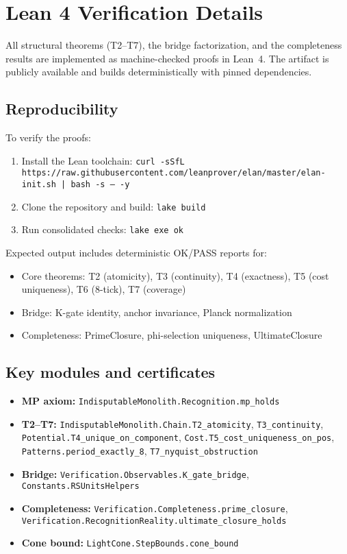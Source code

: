 \documentclass[11pt]{article}
\begin{document}
\appendix

\section{Lean 4 Verification Details}\label{app:lean-verification}

All structural theorems (T2--T7), the bridge factorization, and the completeness results are implemented as machine-checked proofs in Lean~4. The artifact is publicly available and builds deterministically with pinned dependencies.

\subsection*{Reproducibility}

To verify the proofs:
\begin{enumerate}
\item Install the Lean toolchain: \texttt{curl -sSfL https://raw.githubusercontent.com/leanprover/elan/master/elan-init.sh | bash -s -- -y}
\item Clone the repository and build: \texttt{lake build}
\item Run consolidated checks: \texttt{lake exe ok}
\end{enumerate}

Expected output includes deterministic OK/PASS reports for:
\begin{itemize}
\item Core theorems: T2 (atomicity), T3 (continuity), T4 (exactness), T5 (cost uniqueness), T6 (8-tick), T7 (coverage)
\item Bridge: K-gate identity, anchor invariance, Planck normalization
\item Completeness: PrimeClosure, phi-selection uniqueness, UltimateClosure
\end{itemize}

\subsection*{Key modules and certificates}

\begin{itemize}
\item \textbf{MP axiom:} \texttt{IndisputableMonolith.Recognition.mp\_holds}
\item \textbf{T2--T7:} \texttt{IndisputableMonolith.Chain.T2\_atomicity}, \texttt{T3\_continuity}, \texttt{Potential.T4\_unique\_on\_component}, \texttt{Cost.T5\_cost\_uniqueness\_on\_pos}, \texttt{Patterns.period\_exactly\_8}, \texttt{T7\_nyquist\_obstruction}
\item \textbf{Bridge:} \texttt{Verification.Observables.K\_gate\_bridge}, \texttt{Constants.RSUnitsHelpers}
\item \textbf{Completeness:} \texttt{Verification.Completeness.prime\_closure}, \texttt{Verification.RecognitionReality.ultimate\_closure\_holds}
\item \textbf{Cone bound:} \texttt{LightCone.StepBounds.cone\_bound}
\end{itemize}
\end{document}
